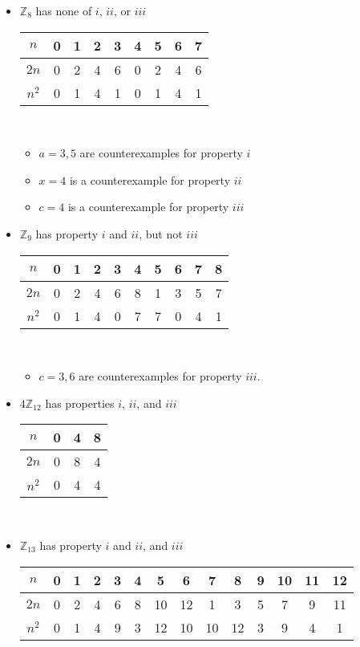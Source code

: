 \documentclass{article}
\begin{document}
\begin{itemize}
  \item $\mathbb{Z}_8$ has none of $i$, $ii$, or $iii$\\
    \begin{tabular} {|c|c|c|c|c|c|c|c|c|}
      \hline $n$   & 0 & 1 & 2 & 3 & 4 & 5 & 6 & 7\\ 
      \hline $2n$  & 0 & 2 & 4 & 6 & 0 & 2 & 4 & 6\\
      \hline $n^2$ & 0 & 1 & 4 & 1 & 0 & 1 & 4 & 1\\                       
      \hline 
    \end{tabular}\\
    \begin{itemize}
    \item $a=3,5$ are counterexamples for property $i$
    \item $x=4$ is a counterexample for property $ii$
    \item $c=4$ is a counterexample for property $iii$
    \end{itemize}
  \item $\mathbb{Z}_9$ has property $i$ and $ii$, but not $iii$\\
    \begin{tabular} {|c|c|c|c|c|c|c|c|c|c|}
      \hline $n$   & 0 & 1 & 2 & 3 & 4 & 5 & 6 & 7 & 8\\
      \hline $2n$  & 0 & 2 & 4 & 6 & 8 & 1 & 3 & 5 & 7\\
      \hline $n^2$ & 0 & 1 & 4 & 0 & 7 & 7 & 0 & 4 & 1\\                   
      \hline 
    \end{tabular}\\
    \begin{itemize}
    \item $c=3,6$ are counterexamples for property $iii$.
    \end{itemize}
  \item $4\mathbb{Z}_{12}$ has properties $i$, $ii$, and $iii$\\
    \begin{tabular} {|c|c|c|c|}
      \hline $n$   & 0 & 4 & 8\\
      \hline $2n$  & 0 & 8 & 4\\
      \hline $n^2$ & 0 & 4 & 4\\                       
      \hline 
    \end{tabular}\\
  \item $\mathbb{Z}_{13}$ has property $i$ and $ii$, and $iii$\\
    \begin{tabular} {|c|c|c|c|c|c|c|c|c|c|c|c|c|c|}
      \hline $n$   & 0 & 1 & 2 & 3 & 4 & 5 & 6 & 7 & 8 & 9 & 10 & 11 & 12\\
      \hline $2n$  & 0 & 2 & 4 & 6 & 8 & 10 & 12 & 1 & 3 & 5 & 7 & 9 & 11\\
      \hline $n^2$ & 0 & 1 & 4 & 9 & 3 & 12 & 10 & 10 & 12 & 3 & 9 & 4 & 1\\                   
      \hline 
    \end{tabular}\\
  \end{itemize}
\end{document}
